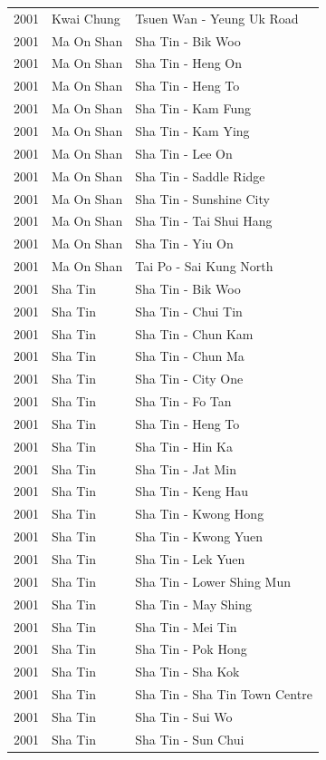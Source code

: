 \begin{longtable}{p{1.2cm}p{3cm}p{7cm}}
2001 & Kwai Chung & Tsuen Wan - Yeung Uk Road \\
2001 & Ma On Shan & Sha Tin - Bik Woo \\
2001 & Ma On Shan & Sha Tin - Heng On \\
2001 & Ma On Shan & Sha Tin - Heng To \\
2001 & Ma On Shan & Sha Tin - Kam Fung \\
2001 & Ma On Shan & Sha Tin - Kam Ying \\
2001 & Ma On Shan & Sha Tin - Lee On \\
2001 & Ma On Shan & Sha Tin - Saddle Ridge \\
2001 & Ma On Shan & Sha Tin - Sunshine City \\
2001 & Ma On Shan & Sha Tin - Tai Shui Hang \\
2001 & Ma On Shan & Sha Tin - Yiu On \\
2001 & Ma On Shan & Tai Po - Sai Kung North \\
2001 & Sha Tin & Sha Tin - Bik Woo \\
2001 & Sha Tin & Sha Tin - Chui Tin \\
2001 & Sha Tin & Sha Tin - Chun Kam \\
2001 & Sha Tin & Sha Tin - Chun Ma \\
2001 & Sha Tin & Sha Tin - City One \\
2001 & Sha Tin & Sha Tin - Fo Tan \\
2001 & Sha Tin & Sha Tin - Heng To \\
2001 & Sha Tin & Sha Tin - Hin Ka \\
2001 & Sha Tin & Sha Tin - Jat Min \\
2001 & Sha Tin & Sha Tin - Keng Hau \\
2001 & Sha Tin & Sha Tin - Kwong Hong \\
2001 & Sha Tin & Sha Tin - Kwong Yuen \\
2001 & Sha Tin & Sha Tin - Lek Yuen \\
2001 & Sha Tin & Sha Tin - Lower Shing Mun \\
2001 & Sha Tin & Sha Tin - May Shing \\
2001 & Sha Tin & Sha Tin - Mei Tin \\
2001 & Sha Tin & Sha Tin - Pok Hong \\
2001 & Sha Tin & Sha Tin - Sha Kok \\
2001 & Sha Tin & Sha Tin - Sha Tin Town Centre \\
2001 & Sha Tin & Sha Tin - Sui Wo \\
2001 & Sha Tin & Sha Tin - Sun Chui \\

\end{longtable}
